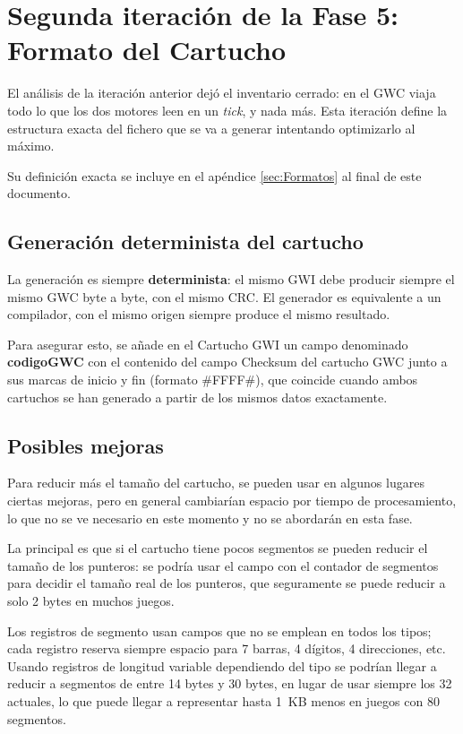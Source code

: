 \section{Segunda iteración de la Fase 5: Formato del Cartucho}
\label{sec:F5I2}

El análisis de la iteración anterior dejó el inventario cerrado: en el GWC viaja todo lo que los dos motores leen en un \textit{tick}, y nada más. Esta iteración define la estructura exacta del fichero que se va a generar intentando optimizarlo al máximo.

Su definición exacta se incluye en el apéndice  \ref{sec:Formatos} al final de este documento.

\subsection{Generación determinista del cartucho}
\label{sec:F5I2Def}

La generación es siempre \textbf{determinista}: el mismo GWI debe
producir siempre el mismo GWC byte a byte, con el mismo CRC. El generador es equivalente a un compilador, con
el mismo origen siempre produce el mismo resultado.

Para asegurar esto, se añade en el Cartucho GWI un campo denominado \textbf{codigoGWC} con el contenido del campo Checksum del cartucho GWC junto a sus marcas de inicio y fin (formato \#FFFF\#), que coincide cuando ambos cartuchos se han generado a partir de los mismos datos exactamente.

\subsection{Posibles mejoras}
\label{sec:F5I2Mejoras}

Para reducir más el tamaño del cartucho, se pueden usar en algunos lugares ciertas mejoras, pero en general cambiarían espacio por tiempo de procesamiento, lo que no se ve necesario en este momento y no se abordarán en esta fase.

La principal es que si el cartucho tiene pocos segmentos se pueden reducir el tamaño de los punteros: se podría usar el campo con el contador de segmentos para decidir el tamaño real de los punteros, que seguramente se puede reducir a solo 2 bytes en muchos juegos.

Los registros de segmento usan campos que no se emplean en todos los tipos; cada registro reserva siempre espacio para 7 barras, 4 dígitos, 4 direcciones, etc. Usando registros de longitud variable dependiendo del tipo se podrían llegar a reducir a segmentos de entre 14 bytes y 30 bytes, en lugar de usar siempre los 32 actuales, lo que puede llegar a representar hasta 1~KB menos en juegos con 80 segmentos.

